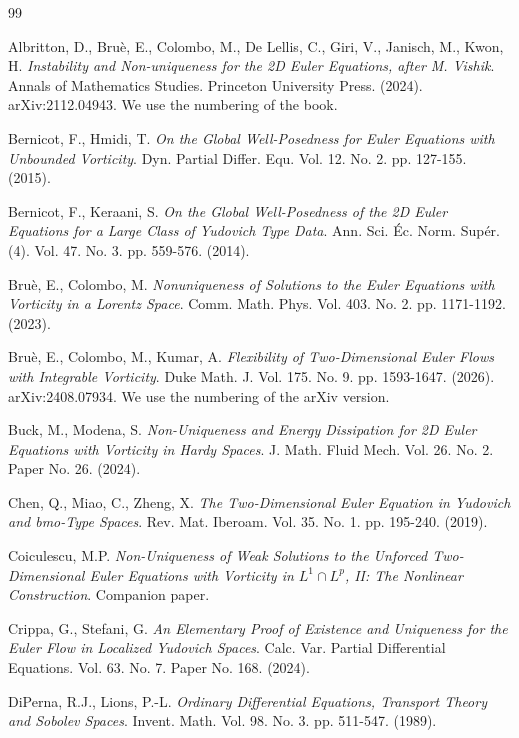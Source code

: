 \begin{thebibliography}{99}

Albritton, D., Bru\`e, E., Colombo, M., De Lellis, C., Giri, V., Janisch, M., Kwon, H.
\textit{Instability and Non-uniqueness for the 2D Euler Equations, after M. Vishik}.
Annals of Mathematics Studies. Princeton University Press. (2024).
arXiv:2112.04943. We use the numbering of the book.

Bernicot, F., Hmidi, T.
\textit{On the Global Well-Posedness for Euler Equations with Unbounded Vorticity}.
Dyn. Partial Differ. Equ. Vol. 12. No. 2. pp. 127-155. (2015).

Bernicot, F., Keraani, S.
\textit{On the Global Well-Posedness of the 2D Euler Equations for a Large Class of
Yudovich Type Data}.
Ann. Sci. \'Ec. Norm. Sup\'er. (4). Vol. 47. No. 3. pp. 559-576. (2014).

Bru\`e, E., Colombo, M.
\textit{Nonuniqueness of Solutions to the Euler Equations with Vorticity in a
Lorentz Space}.
Comm. Math. Phys. Vol. 403. No. 2. pp. 1171-1192. (2023).

Bru\`e, E., Colombo, M., Kumar, A.
\textit{Flexibility of Two-Dimensional Euler Flows with Integrable Vorticity}.
Duke Math. J. Vol. 175. No. 9. pp. 1593-1647. (2026).
arXiv:2408.07934. We use the numbering of the arXiv version.

Buck, M., Modena, S.
\textit{Non-Uniqueness and Energy Dissipation for 2D Euler Equations with
Vorticity in Hardy Spaces}.
J. Math. Fluid Mech. Vol. 26. No. 2. Paper No. 26. (2024).

Chen, Q., Miao, C., Zheng, X.
\textit{The Two-Dimensional Euler Equation in Yudovich and bmo-Type Spaces}.
Rev. Mat. Iberoam. Vol. 35. No. 1. pp. 195-240. (2019).

Coiculescu, M.P.
\textit{Non-Uniqueness of Weak Solutions to the Unforced Two-Dimensional Euler Equations with
Vorticity in $L^1\cap L^p$, II: The Nonlinear Construction}.
Companion paper.

Crippa, G., Stefani, G.
\textit{An Elementary Proof of Existence and Uniqueness for the Euler Flow in
Localized Yudovich Spaces}.
Calc. Var. Partial Differential Equations. Vol. 63. No. 7. Paper No. 168. (2024).

DiPerna, R.J., Lions, P.-L.
\textit{Ordinary Differential Equations, Transport Theory and Sobolev Spaces}.
Invent. Math. Vol. 98. No. 3. pp. 511-547. (1989).


\end{thebibliography}

